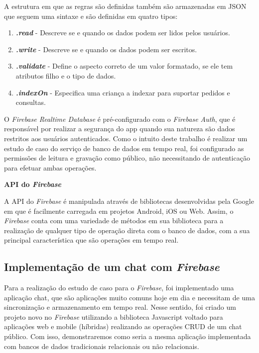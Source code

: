 \documentclass[12pt]{article}
\begin{document}
A estrutura em que as regras são definidas também são armazenadas em JSON que seguem uma sintaxe e são definidas em quatro tipos: 
\begin{enumerate}
  \item \textbf{\textit{.read}} - Descreve se e quando os dados podem ser lidos pelos usuários.
  \item \textbf{\textit{.write}} - Descreve se e quando os dados podem ser escritos.
  \item \textbf{\textit{.validate}} - Define o aspecto correto de um valor formatado, se ele tem atributos filho e o tipo de dados.
  \item \textbf{\textit{.indexOn}} - Especifica uma criança a indexar para suportar pedidos e consultas.
\end{enumerate}

O \textit{Firebase Realtime Database} é pré-configurado com o \textit{Firebase Auth}, que é responsável por realizar a segurança do app quando sua natureza são dados restritos aos usuários autenticados. Como o intuito deste trabalho é realizar um estudo de caso do serviço de banco de dados em tempo real, foi configurado as permissões de leitura e gravação como público, não necessitando de autenticação para efetuar ambas operações.

\textbf{API do \textit{Firebase}}

A API do \textit{Firebase} é manipulada através de bibliotecas desenvolvidas pela Google em que é facilmente carregada em projetos Android, iOS ou Web. Assim, o \textit{Firebase} conta com uma variedade de métodos em sua biblioteca para a realização de qualquer tipo de operação direta com o banco de dados, com a sua principal característica que são operações em tempo real. 

\subsection{Implementação de um chat com \textit{Firebase}}

Para a realização do estudo de caso para o \textit{Firebase}, foi implementado uma aplicação chat, que são aplicações muito comuns hoje em dia e necessitam de uma sincronização e armazenamento em tempo real. Nesse sentido, foi criado um projeto novo no \textit{Firebase} utilizando a biblioteca Javascript voltado para aplicações web e mobile (híbridas) realizando as operações CRUD de um chat público. Com isso,  demonstraremos como seria a mesma aplicação implementada com bancos de dados tradicionais relacionais ou não relacionais.
\end{document}

